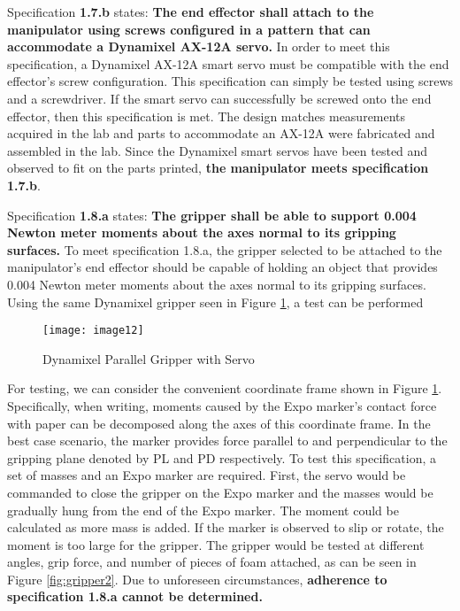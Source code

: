 Specification \textbf{1.7.b} states: \textbf{The end effector shall attach to the manipulator using screws configured in a pattern that can accommodate a Dynamixel AX-12A servo.} In order to meet this specification, a Dynamixel AX-12A smart servo must be compatible with the end effector’s screw configuration. This specification can simply be tested using screws and a screwdriver. If the smart servo can successfully be screwed onto the end effector, then this specification is met. The design matches measurements acquired in the lab and parts to accommodate an AX-12A were fabricated and assembled in the lab. Since the Dynamixel smart servos have been tested and observed to fit on the parts printed, \textbf{the manipulator meets specification 1.7.b}.


Specification \textbf{1.8.a} states: \textbf{The gripper shall be able to support 0.004 Newton meter moments about the axes normal to its gripping surfaces.} To meet specification 1.8.a, the gripper selected to be attached to the manipulator’s end effector should be capable of holding an object that provides 0.004 Newton meter moments about the axes normal to its gripping surfaces. Using the same Dynamixel gripper seen in Figure \ref{fig:gripper4}, a test can be performed

\begin{figure}[htp]
  \centering
  \texttt{[image: image12]}
  \caption{Dynamixel Parallel Gripper with Servo}
  \label{fig:gripper4}
\end{figure}

For testing, we can consider the convenient coordinate frame shown in Figure \ref{fig:gripper4}. Specifically, when writing, moments caused by the Expo marker’s contact force with paper can be decomposed along the axes of this coordinate frame. In the best case scenario, the marker provides force parallel to and perpendicular to the gripping plane denoted by PL and PD respectively.
To test this specification, a set of masses and an Expo marker  are required. First, the servo would be commanded to close the gripper on the Expo marker and the masses would be gradually hung from the end of the Expo marker. The moment could be calculated as more mass is added. If the marker is observed to slip or rotate, the moment is too large for the gripper. The gripper would be tested at different angles, grip force, and number of pieces of foam attached, as can be seen in Figure \ref{fig:gripper2}. Due to unforeseen circumstances, \textbf{adherence to specification 1.8.a cannot be determined.}



